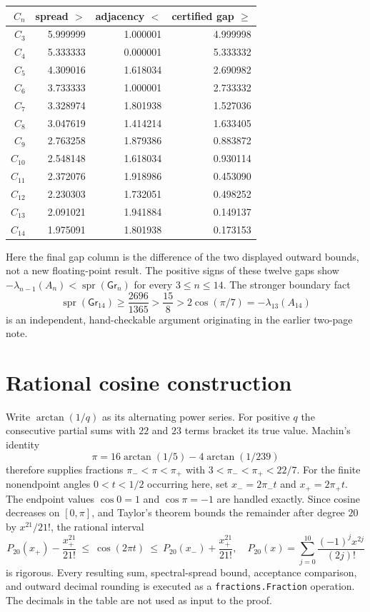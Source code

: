 \documentclass[10pt]{article}
\newcommand{\Gr}{\mathsf{Gr}}
\newcommand{\spr}{\operatorname{spr}}
\begin{document}
\begin{center}\small\begin{tabular}{@{}r r r r@{}}\toprule
$C_n$ & spread $\boldsymbol{>}$ & adjacency $\boldsymbol{<}$ & certified gap $\boldsymbol{\ge}$\\\midrule
$C_3$ & 5.999999 & 1.000001 & 4.999998\\
$C_4$ & 5.333333 & 0.000001 & 5.333332\\
$C_5$ & 4.309016 & 1.618034 & 2.690982\\
$C_6$ & 3.733333 & 1.000001 & 2.733332\\
$C_7$ & 3.328974 & 1.801938 & 1.527036\\
$C_8$ & 3.047619 & 1.414214 & 1.633405\\
$C_9$ & 2.763258 & 1.879386 & 0.883872\\
$C_{10}$ & 2.548148 & 1.618034 & 0.930114\\
$C_{11}$ & 2.372076 & 1.918986 & 0.453090\\
$C_{12}$ & 2.230303 & 1.732051 & 0.498252\\
$C_{13}$ & 2.091021 & 1.941884 & 0.149137\\
$C_{14}$ & 1.975091 & 1.801938 & 0.173153\\\bottomrule
\end{tabular}\end{center}
Here the final gap column is the difference of the two displayed outward bounds, not a new floating-point result. The positive signs of these twelve gaps show $-\lambda_{n-1}(A_n)<\spr(\Gr_n)$ for every $3\le n\le14$. The stronger boundary fact
\[
\spr(\Gr_{14})\ge\frac{2696}{1365}>\frac{15}{8}>2\cos(\pi/7)=-\lambda_{13}(A_{14})
\]
is an independent, hand-checkable argument originating in the earlier two-page note.
\section{Rational cosine construction}
Write $\arctan(1/q)$ as its alternating power series. For positive $q$ the consecutive partial sums with $22$ and $23$ terms bracket its true value. Machin's identity
\[
\pi=16\arctan(1/5)-4\arctan(1/239)
\]
therefore supplies fractions $\pi_-<\pi<\pi_+$ with $3<\pi_-<\pi_+<22/7$. For the finite nonendpoint angles $0<t<1/2$ occurring here, set $x_-=2\pi_-t$ and $x_+=2\pi_+t$. The endpoint values $\cos0=1$ and $\cos\pi=-1$ are handled exactly. Since cosine decreases on $[0,\pi]$, and Taylor's theorem bounds the remainder after degree $20$ by $x^{21}/21!$, the rational interval
\[
P_{20}(x_+)-\frac{x_+^{21}}{21!}\ \le\ \cos(2\pi t)\ \le\
P_{20}(x_-)+\frac{x_+^{21}}{21!},
\quad P_{20}(x)=\sum_{j=0}^{10}\frac{(-1)^j x^{2j}}{(2j)!}
\]
is rigorous. Every resulting sum, spectral-spread bound, acceptance comparison, and outward decimal rounding is executed as a \texttt{fractions.Fraction} operation. The decimals in the table are not used as input to the proof.
\end{document}
